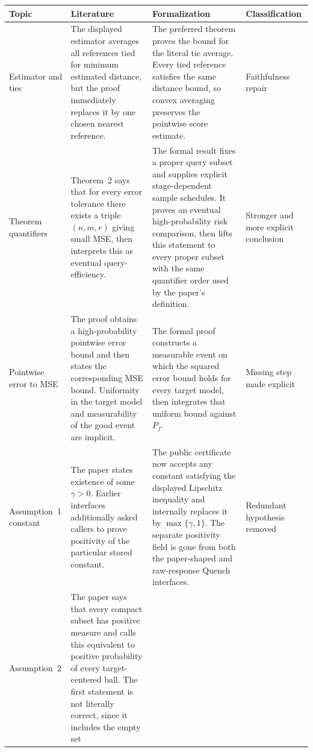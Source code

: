 \documentclass[11pt]{article}
\begin{document}
\begin{longtable}{>{\raggedright\arraybackslash}p{}
                  >{\raggedright\arraybackslash}p{}
                  >{\raggedright\arraybackslash}p{}
                  >{\raggedright\arraybackslash}p{}}
\toprule
Topic & Literature & Formalization & Classification \\
\midrule
\endhead
Estimator and ties & The displayed estimator averages all references tied for
minimum estimated distance, but the proof immediately replaces it by one
chosen nearest reference. & The preferred theorem proves the bound for the
literal tie average.  Every tied reference satisfies the same distance bound,
so convex averaging preserves the pointwise score estimate. & Faithfulness
repair \\
\addlinespace
Theorem quantifiers & Theorem~2 says that for every error tolerance there exists
a triple $(n,m,r)$ giving small MSE, then interprets this as eventual
query-efficiency. & The formal result fixes a proper query subset and supplies
explicit stage-dependent sample schedules.  It proves an eventual
high-probability risk comparison, then lifts this statement to every proper
subset with the same quantifier order used by the paper's definition. &
Stronger and more explicit conclusion \\
\addlinespace
Pointwise error to MSE & The proof obtains a high-probability pointwise error
bound and then states the corresponding MSE bound.  Uniformity in the target
model and measurability of the good event are implicit. & The formal proof
constructs a measurable event on which the squared error bound holds for every
target model, then integrates that uniform bound against $P_f$. & Missing step
made explicit \\
\addlinespace
Assumption~1 constant & The paper states existence of some $\gamma>0$.  Earlier
interfaces additionally asked callers to prove positivity of the particular
stored constant. & The public certificate now accepts any constant satisfying
the displayed Lipschitz inequality and internally replaces it by
$\max\{\gamma,1\}$.  The separate positivity field is gone from both the
paper-shaped and raw-response Quench interfaces. & Redundant hypothesis removed \\
\addlinespace
Assumption~2 & The paper says that every compact subset has positive measure and
calls this equivalent to positive probability of every target-centered ball.
The first statement is not literally correct, since it includes the empty set

\end{longtable}
\end{document}
